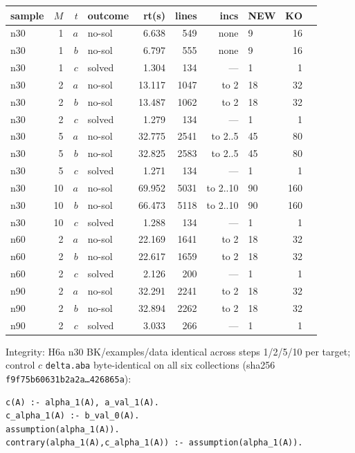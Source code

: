 \documentclass[11pt]{article}
\begin{document}
{\footnotesize
\begin{center}
\begin{tabular}{@{}lrrlrrrlrr@{}}
\toprule
sample & $M$ & $t$ & outcome & rt(s) & lines & incs & NEW & KO \\
\midrule
n30 & 1 & $a$ & no-sol & 6.638 & 549 & none & 9 & 16 \\
n30 & 1 & $b$ & no-sol & 6.797 & 555 & none & 9 & 16 \\
n30 & 1 & $c$ & solved & 1.304 & 134 & --- & 1 & 1 \\
n30 & 2 & $a$ & no-sol & 13.117 & 1047 & to 2 & 18 & 32 \\
n30 & 2 & $b$ & no-sol & 13.487 & 1062 & to 2 & 18 & 32 \\
n30 & 2 & $c$ & solved & 1.279 & 134 & --- & 1 & 1 \\
n30 & 5 & $a$ & no-sol & 32.775 & 2541 & to 2..5 & 45 & 80 \\
n30 & 5 & $b$ & no-sol & 32.825 & 2583 & to 2..5 & 45 & 80 \\
n30 & 5 & $c$ & solved & 1.271 & 134 & --- & 1 & 1 \\
n30 & 10 & $a$ & no-sol & 69.952 & 5031 & to 2..10 & 90 & 160 \\
n30 & 10 & $b$ & no-sol & 66.473 & 5118 & to 2..10 & 90 & 160 \\
n30 & 10 & $c$ & solved & 1.288 & 134 & --- & 1 & 1 \\
n60 & 2 & $a$ & no-sol & 22.169 & 1641 & to 2 & 18 & 32 \\
n60 & 2 & $b$ & no-sol & 22.617 & 1659 & to 2 & 18 & 32 \\
n60 & 2 & $c$ & solved & 2.126 & 200 & --- & 1 & 1 \\
n90 & 2 & $a$ & no-sol & 32.291 & 2241 & to 2 & 18 & 32 \\
n90 & 2 & $b$ & no-sol & 32.894 & 2262 & to 2 & 18 & 32 \\
n90 & 2 & $c$ & solved & 3.033 & 266 & --- & 1 & 1 \\
\bottomrule
\end{tabular}
\end{center}
}

Integrity: H6a n30 BK/examples/data identical across steps 1/2/5/10 per target;
control $c$ \texttt{delta.aba} byte-identical on all six collections
(sha256 \texttt{f9f75b60631b2a2a\ldots426865a}):
\begin{verbatim}
c(A) :- alpha_1(A), a_val_1(A).
c_alpha_1(A) :- b_val_0(A).
assumption(alpha_1(A)).
contrary(alpha_1(A),c_alpha_1(A)) :- assumption(alpha_1(A)).
\end{verbatim}
\end{document}
